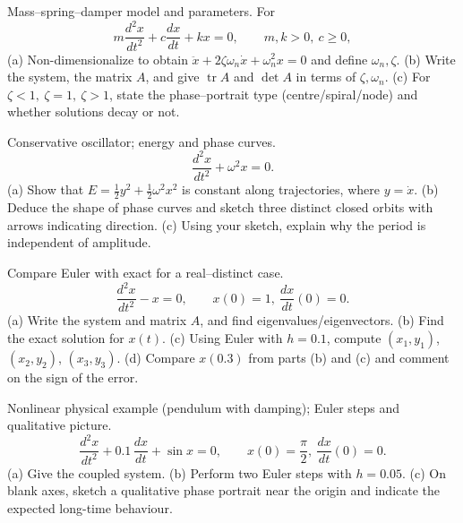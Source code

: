 \documentclass[11pt]{article}
\def\textbf#1{#1}%
\newcounter{question}
\begin{document}
\begin{question}
\textbf{Mass–spring–damper model and parameters.}
For
\[
m\frac{d^{2}x}{dt^{2}}+c\frac{dx}{dt}+kx=0,\qquad m,k>0,\ c\ge0,
\]
(a) Non-dimensionalize to obtain \(\ddot x+2\zeta\omega_n \dot x+\omega_n^2 x=0\) and define \(\omega_n,\zeta\).  
(b) Write the system, the matrix \(A\), and give \(\operatorname{tr}A\) and \(\det A\) in terms of \(\zeta,\omega_n\).  
(c) For \(\zeta<1,\ \zeta=1,\ \zeta>1\), state the phase–portrait type (centre/spiral/node) and whether solutions decay or not.
\end{question}

\begin{question}
\textbf{Conservative oscillator; energy and phase curves.}
\[
\frac{d^{2}x}{dt^{2}}+\omega^{2}x=0.
\]
(a) Show that \(E=\tfrac12 y^{2}+\tfrac12 \omega^{2}x^{2}\) is constant along trajectories, where \(y=\dot x\).  
(b) Deduce the shape of phase curves and sketch three distinct closed orbits with arrows indicating direction.  
(c) Using your sketch, explain why the period is independent of amplitude.
\end{question}

\begin{question}
\textbf{Compare Euler with exact for a real–distinct case.}
\[
\frac{d^{2}x}{dt^{2}}-x=0,\qquad x(0)=1,\ \frac{dx}{dt}(0)=0.
\]
(a) Write the system and matrix \(A\), and find eigenvalues/eigenvectors.  
(b) Find the exact solution for \(x(t)\).  
(c) Using Euler with \(h=0.1\), compute \((x_{1},y_{1})\), \((x_{2},y_{2})\), \((x_{3},y_{3})\).  
(d) Compare \(x(0.3)\) from parts (b) and (c) and comment on the sign of the error.
\end{question}

\begin{question}
\textbf{Nonlinear physical example (pendulum with damping); Euler steps and qualitative picture.}
\[
\frac{d^{2}x}{dt^{2}}+0.1\,\frac{dx}{dt}+\sin x=0,\qquad x(0)=\frac{\pi}{2},\ \frac{dx}{dt}(0)=0.
\]
(a) Give the coupled system.  
(b) Perform two Euler steps with \(h=0.05\).  
(c) On blank axes, sketch a qualitative phase portrait near the origin and indicate the expected long-time behaviour.
\begin{center}
\end{center}
\end{question}
\end{document}
